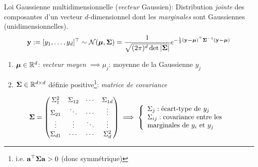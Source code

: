 \documentclass[xcolor=svgnames, t]{beamer}
\newcommand{\coloredemph}[1]{\textcolor{internationalblue}{\emph{#1}}}
\newcommand{\vectorx}[1]{\boldsymbol{\MakeLowercase{\mathbf{#1}}}}
\newcommand{\matrixx}[1]{\boldsymbol{\MakeUppercase{#1}}}
\begin{document}
\begin{frame}
  \frametitle{\secname}

  Loi Gaussienne multidimensionnelle (\coloredemph{vecteur} Gaussien): Distribution \coloredemph{jointe} des composantes d'un vecteur $d$-dimensionnel dont les \coloredemph{marginales} sont Gaussiennes (unidimensionnelles).
  \begin{equation*}
    \vectorx{Y} := [ y_1, \dots, y_d ]^\top  \sim \mathcal{N}(\vectorx{\mu} , \matrixx{\Sigma}) =  \frac{1}{\sqrt{(2 \pi)^d \det |\matrixx{\Sigma}|}} e^{-\frac{1}{2}(\vectorx{y - \mu})^\top \matrixx{\Sigma}^{-1} (\vectorx{y - \mu})}
  \end{equation*}
% 
  \begin{enumerate}
    \item $\vectorx{\mu} \in \mathbb{R}^d$: \coloredemph{vecteur moyen} $\implies \mu_j$: moyenne de la Gaussienne $y_j$
    \item $\matrixx{\Sigma} \in \mathbb{R}^{d \times d}$ définie positive\footnote{i.e. $\vectorx{a}^\top \matrixx{\Sigma} \vectorx{a} > 0$ (donc symmétrique)}: \coloredemph{matrice de covariance}
  \end{enumerate}
% 
  \pause
  \begin{equation*}
    \matrixx{\Sigma}
    =
    \begin{pmatrix} 
      \Sigma^2_{1}  & \Sigma_{{1}{2}} &  \cdots & \Sigma_{{1}{d}} \\
      \Sigma_{{2}{1}} & \ddots          & \cdots  & \vdots \\
      \vdots          & \vdots          & \ddots  & \vdots \\
      \Sigma_{{d}{1}} & \cdots          & \cdots  &  \Sigma^2_{d} 
      \end{pmatrix}
    \implies
    \left\{
      \begin{array}{ll}
        \Sigma_j  : \text{écart-type} \text{ de } y_j\\
        \Sigma_{ij} : \text{covariance entre les } \\
        \text{marginales de } y_i \text{ et } y_j
      \end{array}
    \right.
  \end{equation*}

\end{frame}
\end{document}
